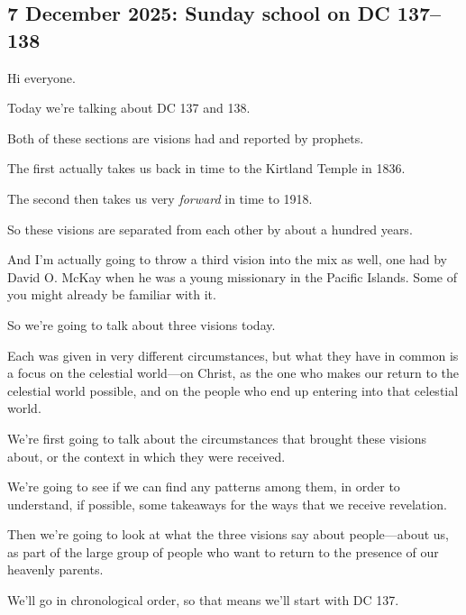 	\subsection{7 December 2025: Sunday school on DC 137--138}
		\label{TALKS-07-12-2025}
		
		\begin{compactitem}

			\item Hi everyone.
				\begin{compactitem}
					\item Today we're talking about DC 137 and 138.
					\item Both of these sections are visions had and reported by prophets.
					\item The first actually takes us back in time to the Kirtland Temple in 1836.
					\item The second then takes us very \textit{forward} in time to 1918.
					\item So these visions are separated from each other by about a hundred years.
					\item And I'm actually going to throw a third vision into the mix as well, one had by David O. McKay when he was a young missionary in the Pacific Islands. Some of you might already be familiar with it.
					\item {}
				\end{compactitem}
				
			\item So we're going to talk about three visions today. 
				\begin{compactitem}
					\item Each was given in very different circumstances, but what they have in common is a focus on the celestial world---on Christ, as the one who makes our return to the celestial world possible, and on the people who end up entering into that celestial world.
					\item We're first going to talk about the circumstances that brought these visions about, or the context in which they were received.
					\item We're going to see if we can find any patterns among them, in order to understand, if possible, some takeaways for the ways that we receive revelation.
					\item Then we're going to look at what the three visions say about people---about us, as part of the large group of people who want to return to the presence of our heavenly parents.
					\item We'll go in chronological order, so that means we'll start with DC 137.
				\end{compactitem}
				

\end{compactitem}
